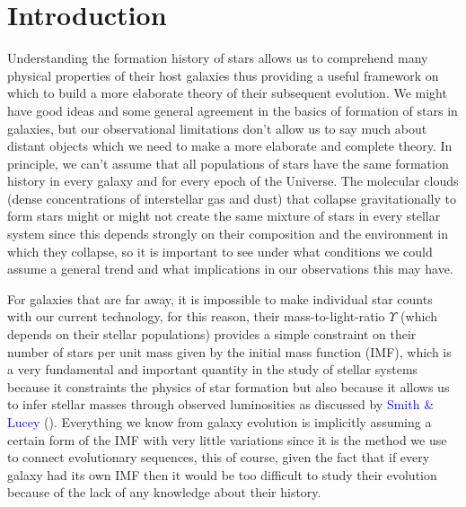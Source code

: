 \chapter{Introduction}

Understanding the formation history of stars allows us to comprehend many physical properties of their host galaxies thus providing a useful framework on which to build a more elaborate theory of their subsequent evolution. We might have good ideas and some general agreement in the basics of formation of stars in galaxies, but our observational limitations don't allow us to say much about distant objects which we need to make a more elaborate and complete theory. In principle, we can't assume that all populations of stars have the same formation history in every galaxy and for every epoch of the Universe. The molecular clouds (dense concentrations of interstellar gas and dust) that collapse gravitationally to form stars might or might not create the same mixture of stars in every stellar system since this depends strongly on their composition and the environment in which they collapse, so it is important to see under what conditions we could assume a general trend and what implications in our observations this may have.

For galaxies that are far away, it is impossible to make individual star counts with our current technology, for this reason, their mass-to-light-ratio $\Upsilon$ (which depends on their stellar populations) provides a simple constraint on their number of stars per unit mass given by the initial mass function (IMF), which is a very fundamental and important quantity in the study of stellar systems because it constraints the physics of star formation but also because it allows us to infer stellar masses through observed luminosities as discussed by \textcolor{blue}{Smith \& Lucey} (\citeyear{Reference7}). Everything we know from galaxy evolution is implicitly assuming a certain form of the IMF with very little variations since it is the method we use to connect evolutionary sequences, this of course, given the fact that if every galaxy had its own IMF then it would be too difficult to study their evolution because of the lack of any knowledge about their history. 

